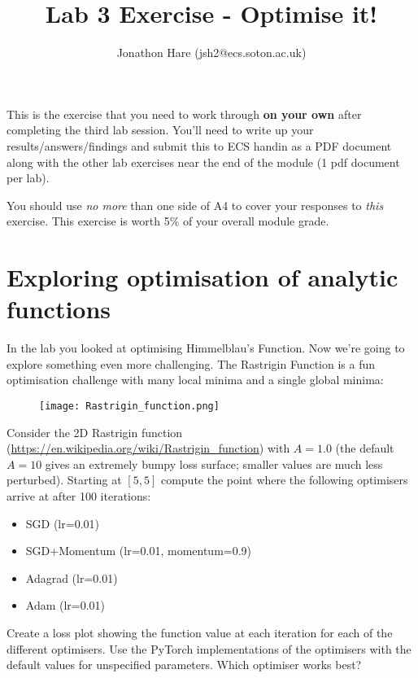 \documentclass[a4paper]{article}
\begin{document}
\lstset{language=Python,upquote=true}

\setlength{\leftskip}{20pt}
\title{Lab 3 Exercise - Optimise it!}
\author{Jonathon Hare (jsh2@ecs.soton.ac.uk)}

\maketitle


This is the exercise that you need to work through \textbf{on your own} after completing the third lab session. You'll need to write up your results/answers/findings and submit this to ECS handin as a PDF document along with the other lab exercises near the end of the module (1 pdf document per lab). 

You should use \emph{no more} than one side of A4 to cover your responses to \emph{this} exercise. This exercise is worth 5\% of your overall module grade.

\section{Exploring optimisation of analytic functions}\label{analytic}
In the lab you looked at optimising Himmelblau's Function. Now we're going to explore something even more challenging. The Rastrigin Function is a fun optimisation challenge with many local minima and a single global minima:

\begin{figure}[h!]
	\center
	\texttt{[image: Rastrigin\_function.png]}
\end{figure}

\begin{tcolorbox}[title=1.1 Rastrigin (3 marks)]
Consider the 2D Rastrigin function (\url{https://en.wikipedia.org/wiki/Rastrigin_function}) with $A=1.0$ (the default $A=10$ gives an extremely bumpy loss surface; smaller values are much less perturbed). Starting at $[5, 5]$ compute the point where the following optimisers arrive at after 100 iterations:

\begin{itemize}
	\item SGD (lr=0.01)
	\item SGD+Momentum (lr=0.01, momentum=0.9)
	\item Adagrad (lr=0.01)
	\item Adam (lr=0.01)
\end{itemize}

Create a loss plot showing the function value at each iteration for each of the different optimisers. Use the PyTorch implementations of the optimisers with the default values for unspecified parameters. Which optimiser works best?
\end{tcolorbox}
\end{document}
